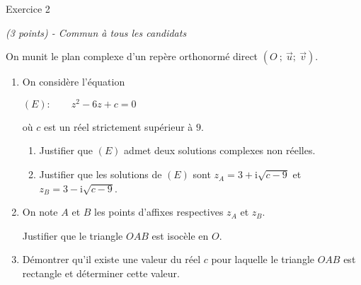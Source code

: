 
%
\begin{h2}Exercice 2\end{h2}
\textit{(3 points) - Commun à tous les candidats}
\par
On munit le plan complexe d'un repère orthonormé direct $(O~;~\vec{u};~\vec{v})$.
\begin{enumerate}
     \item
     On considère l'équation
     \begin{center}$(E) :\qquad  z^2-6z+c = 0$\end{center}
     où $c$ est un réel strictement supérieur à $9$.
     \begin{enumerate}[label=\alph*.]
          \item
          Justifier que $(E)$ admet deux solutions complexes non réelles.
          \item
          Justifier que les solutions de $(E)$ sont $z_{A} = 3+\text{i}\sqrt{c-9}$  et $z_{B} = 3-\text{i}\sqrt{c-9}$.
     \end{enumerate}
     \item
     On note $A$ et $B$ les points d'affixes respectives $z_{A}$ et $z_{B}$.
     \par
     Justifier que le triangle $OAB$ est isocèle en $O$.
     \item
     Démontrer qu'il existe une valeur du réel $c$ pour laquelle le triangle $OAB$ est rectangle et déterminer cette valeur.
\end{enumerate}
